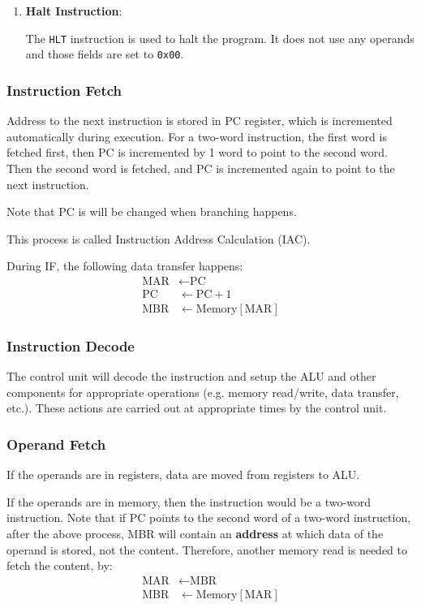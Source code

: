 \begin{enumerate}
\item \textbf{Halt Instruction}:

The \texttt{HLT} instruction is used to halt the program. It does not use any operands
and those fields are set to \texttt{0x00}.

\end{enumerate}

\subsubsection{Instruction Fetch}

Address to the next instruction is stored in PC register, which is incremented automatically
during execution. For a two-word instruction, the first word is fetched first, then PC
is incremented by 1 word to point to the second word. Then the second word is fetched,
and PC is incremented again to point to the next instruction.

Note that PC is will be changed when branching happens.

This process is called Instruction Address Calculation (IAC).

During IF, the following data transfer happens:
\begin{align*}
    \text{MAR} &\leftarrow \text{PC} \\
    \text{PC} &\leftarrow \text{PC} + 1 \\
    \text{MBR} &\leftarrow \text{Memory}[\text{MAR}]
\end{align*}

\subsubsection{Instruction Decode}

The control unit will decode the instruction and setup the ALU and other components
for appropriate operations (e.g. memory read/write, data transfer, etc.). These actions
are carried out at appropriate times by the control unit.

\subsubsection{Operand Fetch}

If the operands are in registers, data are moved from registers to ALU.

If the operands are in memory, then the instruction would be a two-word instruction.
Note that if PC points to the second word of a two-word instruction, after the above process,
MBR will contain an \textbf{address} at which data of the operand is stored,
not the content. Therefore, another
memory read is needed to fetch the content, by:
\begin{align*}
    \text{MAR} &\leftarrow \text{MBR} \\
    \text{MBR} &\leftarrow \text{Memory}[\text{MAR}]
\end{align*}

